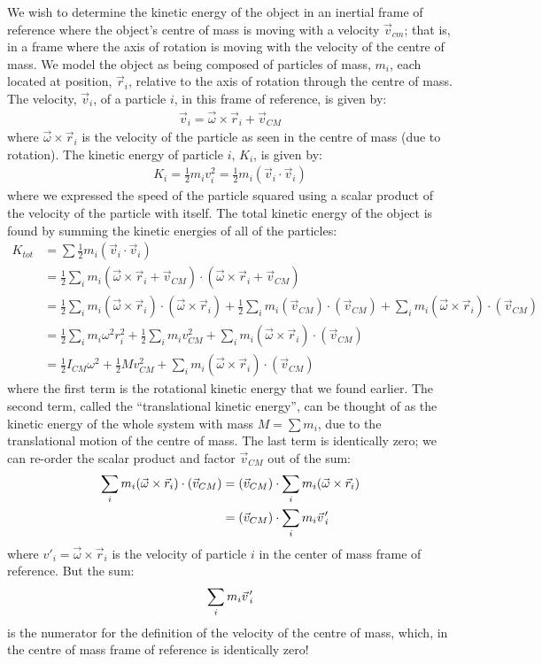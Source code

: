 We wish to determine the kinetic energy of the object in an inertial frame of reference where the object's centre of mass is moving with a velocity $\vec v_{cm}$; that is, in a frame where the axis of rotation is moving with the velocity of the centre of mass. We model the object as being composed of particles of mass, $m_i$, each located at position, $\vec r_i$, relative to the axis of rotation through the centre of mass. The velocity, $\vec v_i$, of a particle $i$, in this frame of reference, is given by:
\begin{align*}
\vec v_i = \vec\omega \times \vec r_i + \vec v_{CM}
\end{align*}
where $\vec\omega \times \vec r_i$ is the velocity of the particle as seen in the centre of mass (due to rotation). The kinetic energy of particle $i$, $K_i$, is given by:
\begin{align*}
K_i = \frac{1}{2}m_iv_i^2 = \frac{1}{2}m_i(\vec v_i\cdot \vec v_i)
\end{align*}
where we expressed the speed of the particle squared using a scalar product of the velocity of the particle with itself. The total kinetic energy of the object is found by summing the kinetic energies of all of the particles:
\begin{align*}
K_{tot} &= \sum \frac{1}{2}m_i(\vec v_i\cdot \vec v_i) \\
&=\frac{1}{2} \sum_i m_i (\vec\omega \times \vec r_i + \vec v_{CM}) \cdot (\vec\omega \times \vec r_i + \vec v_{CM})\\
&=\frac{1}{2} \sum_i m_i (\vec\omega \times \vec r_i)\cdot(\vec\omega \times \vec r_i ) + \frac{1}{2} \sum_i m_i (\vec v_{CM}) \cdot (\vec v_{CM}) + \sum_i m_i (\vec\omega \times \vec r_i) \cdot (\vec v_{CM})\\
&=\frac{1}{2}  \sum_i m_i \omega^2r_i^2 + \frac{1}{2} \sum_i m_i v_{CM}^2 + \sum_i m_i (\vec\omega \times \vec r_i) \cdot (\vec v_{CM})\\
&=\frac{1}{2} I_{CM}\omega ^2 + \frac{1}{2}M v_{CM}^2+\sum_i m_i (\vec\omega \times \vec r_i) \cdot (\vec v_{CM})
\end{align*} 
where the first term is the rotational kinetic energy that we found earlier. The second term, called the ``translational kinetic energy'', can be thought of as the kinetic energy of the whole system with mass $M=\sum m_i$, due to the translational motion of the centre of mass. The last term is identically zero; we can re-order the scalar product and factor $\vec v_{CM}$ out of the sum:
\begin{align*}
\sum_i m_i (\vec\omega \times \vec r_i) \cdot (\vec v_{CM}) &= (\vec v_{CM}) \cdot \sum_i m_i (\vec\omega \times \vec r_i)\\
&=(\vec v_{CM}) \cdot \sum_i m_i \pvec v'_{i}
\end{align*}
where $v'_{i} = \vec\omega \times \vec r_i$ is the velocity of particle $i$ in the center of mass frame of reference. But the sum:
\begin{align*}
\sum_i m_i \pvec v'_{i}
\end{align*}
is the numerator for the definition of the velocity of the centre of mass, which, in the centre of mass frame of reference is identically zero!

